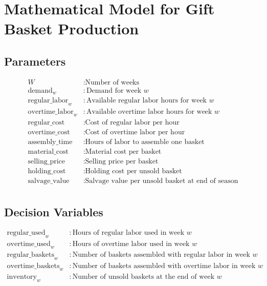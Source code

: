 \documentclass{article}
\begin{document}
\section*{Mathematical Model for Gift Basket Production}

\subsection*{Parameters}
\begin{align*}
W & : \text{Number of weeks} \\
\text{demand}_{w} & : \text{Demand for week } w \\
\text{regular\_labor}_{w} & : \text{Available regular labor hours for week } w \\
\text{overtime\_labor}_{w} & : \text{Available overtime labor hours for week } w \\
\text{regular\_cost} & : \text{Cost of regular labor per hour} \\
\text{overtime\_cost} & : \text{Cost of overtime labor per hour} \\
\text{assembly\_time} & : \text{Hours of labor to assemble one basket} \\
\text{material\_cost} & : \text{Material cost per basket} \\
\text{selling\_price} & : \text{Selling price per basket} \\
\text{holding\_cost} & : \text{Holding cost per unsold basket} \\
\text{salvage\_value} & : \text{Salvage value per unsold basket at end of season} \\
\end{align*}

\subsection*{Decision Variables}
\begin{align*}
\text{regular\_used}_{w} & : \text{Hours of regular labor used in week } w \\
\text{overtime\_used}_{w} & : \text{Hours of overtime labor used in week } w \\
\text{regular\_baskets}_{w} & : \text{Number of baskets assembled with regular labor in week } w \\
\text{overtime\_baskets}_{w} & : \text{Number of baskets assembled with overtime labor in week } w \\
\text{inventory}_{w} & : \text{Number of unsold baskets at the end of week } w \\
\end{align*}
\end{document}

